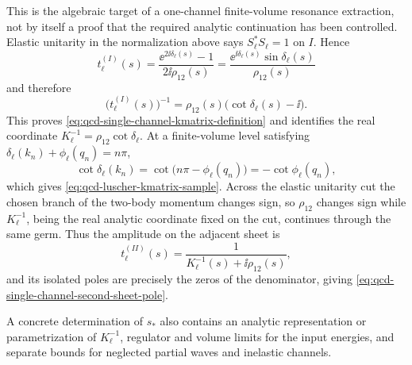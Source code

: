 This is the algebraic target of a one-channel finite-volume resonance
extraction, not by itself a proof that the required analytic continuation has
been controlled.  Elastic unitarity in the normalization above says
\(S_\ell^\ast S_\ell=1\) on \(I\).  Hence
\[
  t_\ell^{(I)}(s)
  =
  \frac{\ee^{2\ii\delta_\ell(s)}-1}{2\ii\rho_{12}(s)}
  =
  \frac{\ee^{\ii\delta_\ell(s)}\sin\delta_\ell(s)}
       {\rho_{12}(s)}
\]
and therefore
\[
  \bigl(t_\ell^{(I)}(s)\bigr)^{-1}
  =
  \rho_{12}(s)\bigl(\cot\delta_\ell(s)-\ii\bigr).
\]
This proves \eqref{eq:qcd-single-channel-kmatrix-definition} and identifies
the real coordinate \(K_\ell^{-1}=\rho_{12}\cot\delta_\ell\).  At a
finite-volume level satisfying
\(\delta_\ell(k_n)+\phi_\ell(q_n)=n\pi\),
\[
  \cot\delta_\ell(k_n)
  =
  \cot\bigl(n\pi-\phi_\ell(q_n)\bigr)
  =
  -\cot\phi_\ell(q_n),
\]
which gives \eqref{eq:qcd-luscher-kmatrix-sample}.  Across the elastic
unitarity cut the chosen branch of the two-body momentum changes sign, so
\(\rho_{12}\) changes sign while \(K_\ell^{-1}\), being the real analytic
coordinate fixed on the cut, continues through the same germ.  Thus the
amplitude on the adjacent sheet is
\[
  t_\ell^{(II)}(s)=
  \frac{1}{K_\ell^{-1}(s)+\ii\rho_{12}(s)} ,
\]
and its isolated poles are precisely the zeros of the denominator, giving
\eqref{eq:qcd-single-channel-second-sheet-pole}.

A concrete determination of \(s_\ast\) also contains an analytic representation
or parametrization of \(K_\ell^{-1}\), regulator and volume limits for the
input energies, and separate bounds for neglected partial waves and inelastic
channels.

